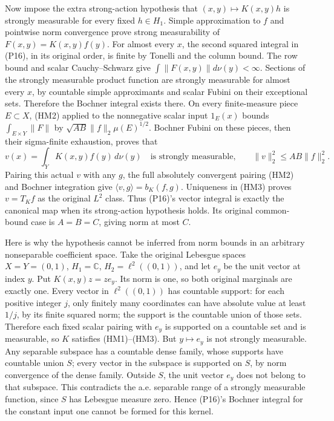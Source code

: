 \documentclass[
  11pt,
]{article}
\begin{document}
Now impose the extra strong-action hypothesis that
\((x,y)\mapsto K(x,y)h\) is strongly measurable for every fixed
\(h\in H_1\). Simple approximation to \(f\) and pointwise norm
convergence prove strong measurability of \(F(x,y)=K(x,y)f(y)\). For
almost every \(x\), the second squared integral in (P16), in its
original order, is finite by Tonelli and the column bound. The row bound
and scalar Cauchy--Schwarz give \(\int\|F(x,y)\|d\nu(y)<\infty\).
Sections of the strongly measurable product function are strongly
measurable for almost every \(x\), by countable simple approximants and
scalar Fubini on their exceptional sets. Therefore the Bochner integral
exists there. On every finite-measure piece \(E\subset X\), (HM2)
applied to the nonnegative scalar input \(1_E(x)\) bounds
\(\int_{E\times Y}\|F\|\) by \(\sqrt{AB}\|f\|_2\mu(E)^{1/2}\). Bochner
Fubini on these pieces, then their sigma-finite exhaustion, proves that
\[
v(x)=\int_YK(x,y)f(y)\,d\nu(y)
\quad\text{is strongly measurable,}\qquad
\|v\|_2^2\le AB\|f\|_2^2.
\tag{HM4}
\] Pairing this actual \(v\) with any \(g\), the full absolutely
convergent pairing (HM2) and Bochner integration give
\(\langle v,g\rangle=b_K(f,g)\). Uniqueness in (HM3) proves \(v=T_Kf\)
as the original \(L^2\) class. Thus (P16)'s vector integral is exactly
the canonical map when its strong-action hypothesis holds. Its original
common-bound case is \(A=B=C\), giving norm at most \(C\).

Here is why the hypothesis cannot be inferred from norm bounds in an
arbitrary nonseparable coefficient space. Take the original Lebesgue
spaces \(X=Y=(0,1)\), \(H_1=\mathbb C\), \(H_2=\ell^2((0,1))\), and let
\(e_y\) be the unit vector at index \(y\). Put \(K(x,y)z=ze_y\). Its
norm is one, so both original marginals are exactly one. Every vector in
\(\ell^2((0,1))\) has countable support: for each positive integer
\(j\), only finitely many coordinates can have absolute value at least
\(1/j\), by its finite squared norm; the support is the countable union
of those sets. Therefore each fixed scalar pairing with \(e_y\) is
supported on a countable set and is measurable, so \(K\) satisfies
(HM1)--(HM3). But \(y\mapsto e_y\) is not strongly measurable. Any
separable subspace has a countable dense family, whose supports have
countable union \(S\); every vector in the subspace is supported on
\(S\), by norm convergence of the dense family. Outside \(S\), the unit
vector \(e_y\) does not belong to that subspace. This contradicts the
a.e. separable range of a strongly measurable function, since \(S\) has
Lebesgue measure zero. Hence (P16)'s Bochner integral for the constant
input one cannot be formed for this kernel.
\end{document}
